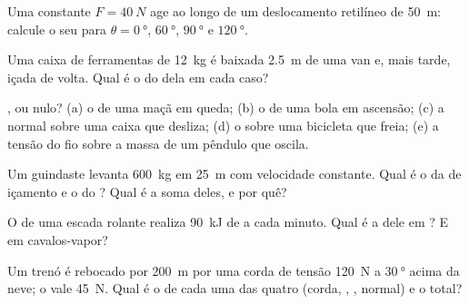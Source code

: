 \begin{exercise}[$\star$]\label{exo:g11:work-of-force:1}
Uma  constante $F = \qty{40}{N}$ age ao longo de um deslocamento
retilíneo de \qty{50}{m}: calcule o seu  para
$\theta = \qty{0}{\degree}$, $\qty{60}{\degree}$, $\qty{90}{\degree}$ e
$\qty{120}{\degree}$.
\end{exercise}

\begin{exercise}[$\star$]\label{exo:g11:work-of-force:2}
Uma caixa de ferramentas de \qty{12}{kg} é baixada \qty{2.5}{m} de uma
van e, mais tarde, içada de volta. Qual é o  do  dela em cada
caso?
\end{exercise}

\begin{exercise}[$\star$]\label{exo:g11:work-of-force:3}
,  ou nulo? (a) o  de uma maçã em queda; (b) o  de
uma bola em ascensão; (c) a  normal sobre uma caixa que desliza;
(d) o  sobre uma bicicleta que freia; (e) a tensão do fio sobre a
massa de um pêndulo que oscila.
\end{exercise}

\begin{exercise}[$\star$]\label{exo:g11:work-of-force:4}
Um guindaste levanta \qty{600}{kg} em \qty{25}{m} com velocidade
constante. Qual é o  da  de içamento e o do ? Qual é a
soma deles, e por quê?
\end{exercise}

\begin{exercise}[$\star$]\label{exo:g11:work-of-force:5}
O  de uma escada rolante realiza \qty{90}{kJ} de  a cada
minuto. Qual é a  dele em ? E em cavalos-vapor?
\end{exercise}

\begin{exercise}[$\star\star$]\label{exo:g11:work-of-force:6}
Um trenó é rebocado por \qty{200}{m} por uma corda de tensão \qty{120}{N}
a $\qty{30}{\degree}$ acima da neve; o  vale \qty{45}{N}. Qual é o
 de cada uma das quatro  (corda, , , normal) e o
total?
\end{exercise}


